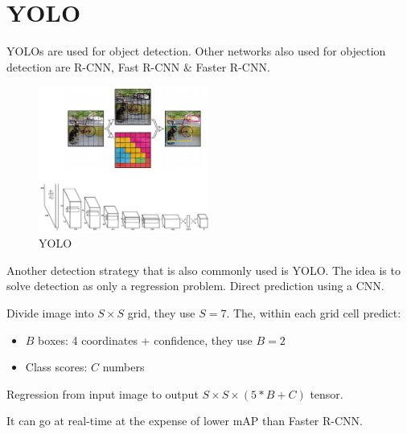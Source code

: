 \chapter{YOLO}
YOLOs are used for object detection. Other networks also used for objection detection are R-CNN, Fast R-CNN \& Faster R-CNN.

\begin{figure}[h]
  \centering
  \includegraphics[width=0.5\textwidth]{Images/yolo/1.png}
  \caption{YOLO}
\end{figure}

Another detection strategy that is also commonly used is YOLO. The idea is to solve detection as only a regression problem. Direct prediction using a CNN.

Divide image into $S \times S$ grid, they use $S = 7$. The, within each grid cell predict:
\begin{itemize}
\item $B$ boxes: 4 coordinates + confidence, they use $B = 2$
\item Class scores: $C$ numbers
\end{itemize}

Regression from input image to output $S \times S \times (5*B+C)$ tensor.

It can go at real-time at the expense of lower mAP than Faster R-CNN.
